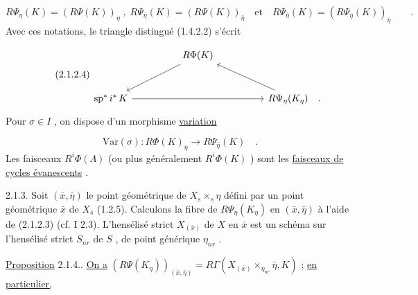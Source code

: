 \begin{equation*}
R\Psi_{\eta}(K) = (R\Psi(K))_{\eta} \;,\; R\Psi_{\bar{\eta}}(K) = (R\Psi(K))_{\bar{\eta}} \quad \text{et} \quad R\Psi_{\bar{\eta}}(K) = (R\Psi_{\eta}(K))_{\bar{\eta}} \qquad .
\end{equation*}
Avec ces notations, le triangle distingué (1.4.2.2) s'écrit 



\begin{equation}\tag{2.1.2.4}
\begin{tikzcd}[row sep=large, column sep=huge]
{} & R\Phi(K) \arrow[dl] & {} \\
\mathrm{sp}^*\, i^*\, K \arrow[rr] & {} & R\Psi_\eta(K_\eta) \arrow[ul] \quad .
\end{tikzcd}
\end{equation}
Pour $\sigma \in I$ , on dispose d'un morphisme \underline{variation}

\begin{equation}\tag{2.1.2.5}
\mathrm{Var}(\sigma) : R\Phi(K)_{\bar\eta} \longrightarrow R\Psi_{\bar\eta}(K) \quad .
\end{equation}
Les faisceaux $R^i\Phi(\Lambda)$ (ou plus généralement $R^i\Phi(K)$ ) sont les \underline{faisceaux de cycles évanescents} .

2.1.3. Soit $(\bar x, \bar\eta)$ le point géométrique de $X_s \times_s \eta$ défini par un point géométrique $\bar x$ de $X_{\bar s}$ (1.2.5). Calculons la fibre de $R\Psi_\eta(K_\eta)$ en $(\bar x, \bar\eta)$ à l'aide de (2.1.2.3) (cf. I 2.3). L'hensélisé strict $X_{(\bar x)}$ de $X$ en $\bar x$ est un schéma sur l'hensélisé strict $S_{nr}$ de $S$ , de point générique $\eta_{nr}$ .

\underline{Proposition} 2.1.4.. \underline{On a} $(R\Psi(K_\eta))_{(\bar x,\bar\eta)} = R\Gamma(X_{(\bar x)} \times_{\eta_{nr}} \bar\eta , K)$ ; \underline{en particulier,}

